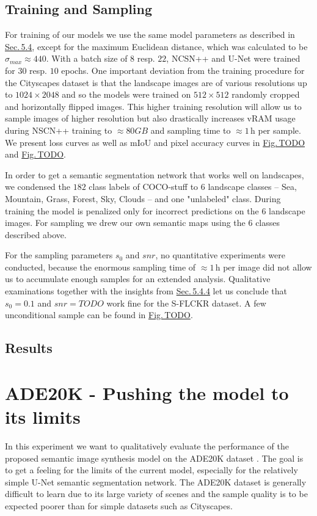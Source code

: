 \subsection{Training and Sampling}
For training of our models we use the same model parameters as described in \hyperref[sec:5.4]{Sec.\,5.4}, except for the maximum Euclidean distance, which was calculated to be $\sigma_{max}\approx440$. With a batch size of $8$ resp. $22$, NCSN++ and U-Net were trained for $30$ resp. $10$ epochs. One important deviation from the training procedure for the Cityscapes dataset is that the landscape images are of various resolutions up to $1024\times2048$ and so the models were trained on $512\times512$ randomly cropped and horizontally flipped images. This higher training resolution will allow us to sample images of higher resolution but also drastically increases vRAM usage during NSCN++ training to $\approx80GB$ and sampling time to $\approx1$\,h per sample. We present loss curves as well as mIoU and pixel accuracy curves in \hyperref[fig:]{Fig.\,TODO} and \hyperref[fig:]{Fig.\,TODO}.

In order to get a semantic segmentation network that works well on landscapes, we condensed the $182$ class labels of COCO-stuff to $6$ landscape classes – Sea, Mountain, Grass, Forest, Sky, Clouds – and one "unlabeled" class. During training the model is penalized only for incorrect predictions on the $6$ landscape images. For sampling we drew our own semantic maps using the $6$ classes described above.

For the sampling parameters $s_0$ and $snr$, no quantitative experiments were conducted, because the enormous sampling time of $\approx1$\,h per image did not allow us to accumulate enough samples for an extended analysis. Qualitative examinations together with the insights from \hyperref[sec:5.4.4]{Sec.\,5.4.4} let us conclude that $s_0=0.1$ and $snr=TODO$ work fine for the S-FLCKR dataset. A few unconditional sample can be found in \hyperref[fig:]{Fig.\,TODO}.
%
\subsection{Results}

\section[ADE20K - Pushing the model to its limits]{ADE20K - Pushing the model to its limits%
    } \label{sec:5.6}
In this experiment we want to qualitatively evaluate the performance of the proposed semantic image synthesis model on the ADE20K dataset \cite{ade20k}. The goal is to get a feeling for the limits of the current model, especially for the relatively simple U-Net semantic segmentation network. The ADE20K dataset is generally difficult to learn due to its large variety of scenes and the sample quality is to be expected poorer than for simple datasets such as Cityscapes. 
